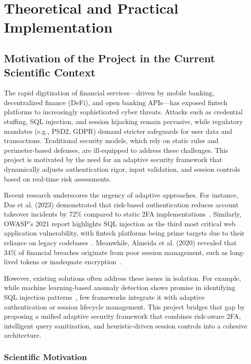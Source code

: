 \chapter{Theoretical and Practical Implementation}

\section{Motivation of the Project in the Current Scientific Context}

The rapid digitization of financial services—driven by mobile banking, decentralized finance (DeFi), and open banking APIs—has exposed fintech platforms to increasingly sophisticated cyber threats. Attacks such as credential stuffing, SQL injection, and session hijacking remain pervasive, while regulatory mandates (e.g., PSD2, GDPR) demand stricter safeguards for user data and transactions. Traditional security models, which rely on static rules and perimeter-based defenses, are ill-equipped to address these challenges. This project is motivated by the need for an adaptive security framework that dynamically adjusts authentication rigor, input validation, and session controls based on real-time risk assessments.

Recent research underscores the urgency of adaptive approaches. For instance, Das et al. (2023) demonstrated that risk-based authentication reduces account takeover incidents by 72\% compared to static 2FA implementations~\cite{das2023adaptive}. Similarly, OWASP’s 2021 report highlights SQL injection as the third most critical web application vulnerability, with fintech platforms being prime targets due to their reliance on legacy codebases~\cite{owasp2021top10}. Meanwhile, Almeida et al. (2020) revealed that 34\% of financial breaches originate from poor session management, such as long-lived tokens or inadequate encryption~\cite{almeida2020session}.

However, existing solutions often address these issues in isolation. For example, while machine learning-based anomaly detection shows promise in identifying SQL injection patterns~\cite{chen2022ml}, few frameworks integrate it with adaptive authentication or session lifecycle management. This project bridges that gap by proposing a unified adaptive security framework that combines risk-aware 2FA, intelligent query sanitization, and heuristic-driven session controls into a cohesive architecture.

\subsection{Scientific Motivation}

